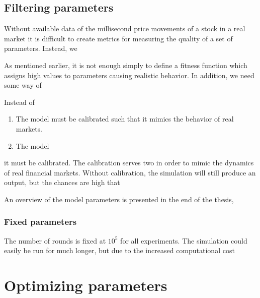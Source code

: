 \subsection{Filtering parameters}\label{section:filtering_parameters}
Without available data of the millisecond price movements of a stock in a real market it is difficult to create metrics for measuring the quality of a set of parameters. Instead, we 


As mentioned earlier, it is not enough simply to define a fitness function which assigns high values to parameters causing realistic behavior. In addition, we need some way of 

Instead of 




\begin{enumerate}
\item The model must be calibrated such that it mimics the behavior of real markets.
\item The model 
\end{enumerate}

it must be calibrated. The calibration serves two  in order to mimic the dynamics of real financial markets. Without calibration, the simulation will still produce an output, but the chances are high that 







An overview of the model parameters is presented in the end of the thesis, 

\subsubsection{Fixed parameters}
The number of rounds is fixed at $10^5$ for all experiments. The simulation could easily be run for much longer, but due to the increased computational cost 






\section{Optimizing parameters}
